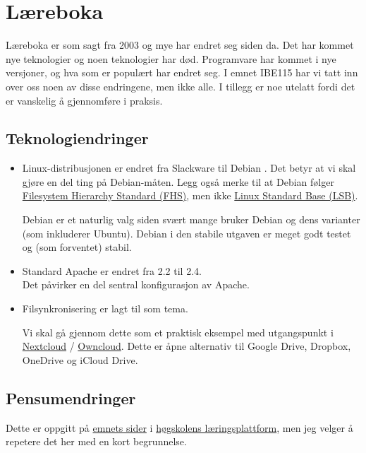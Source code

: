 \chapter{Læreboka}

Læreboka er som sagt fra 2003 og mye har endret seg siden da.
Det har kommet nye teknologier og noen teknologier har død.
Programvare har kommet i nye versjoner, og hva som er populært 
har endret seg. I emnet IBE115 har vi tatt inn over oss noen
av disse endringene, men ikke alle. I tillegg er noe utelatt
fordi det er vanskelig å gjennomføre i praksis.

\section{Teknologiendringer}

\begin{itemize}
\item Linux-distribusjonen er endret fra Slackware til Debian
    . Det betyr at vi skal gjøre
    en del ting på Debian-måten. Legg også merke til at Debian
    følger \href{https://en.wikipedia.org/wiki/Filesystem_Hierarchy_Standard}{Filesystem Hierarchy Standard (FHS)}, 
    men ikke \href{https://en.wikipedia.org/wiki/Linux_Standard_Base}{Linux Standard Base (LSB)}.

    Debian er et naturlig valg siden svært mange bruker Debian 
    og dens varianter (som inkluderer Ubuntu). Debian i den stabile
    utgaven er meget godt testet og (som forventet) stabil.
\item Standard Apache er endret fra 2.2 til 2.4.\\
    Det påvirker en del sentral konfigurasjon av Apache.
\item Filsynkronisering er lagt til som tema.

    Vi skal gå gjennom dette som et praktisk eksempel med utgangspunkt i 
    \href{https://nextcloud.com/}{Nextcloud} / \href{https://owncloud.org/}{Owncloud}.
    Dette er åpne alternativ til Google Drive, Dropbox, OneDrive og iCloud Drive. 
\end{itemize}


\section{Pensumendringer}
Dette er oppgitt på \href{https://himolde.instructure.com/courses/73}{emnets sider} i 
\href{https://himolde.instructure.com/}{høgskolens læringsplattform}, 
men jeg velger å repetere det her med en kort begrunnelse.

